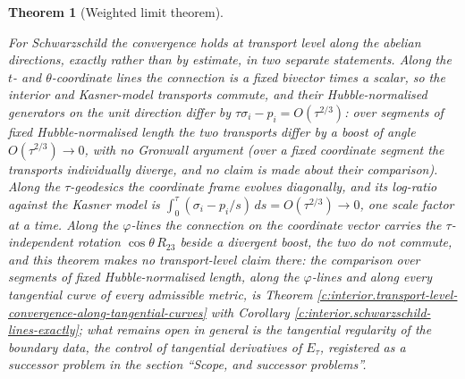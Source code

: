 \documentclass[11pt]{article}
\newtheorem{theorem}{Theorem}[section]
\theoremstyle{definition}
\theoremstyle{plain}
\begin{document}
\begin{theorem}[Weighted limit theorem]
\begin{enumerate}
\end{enumerate}
For Schwarzschild the convergence holds at transport level along the abelian directions, exactly rather than by estimate, in two separate statements. Along the $t$- and $\theta$-coordinate lines the connection is a fixed bivector times a scalar, so the interior and Kasner-model transports commute, and their Hubble-normalised generators on the unit direction differ by $\tau\sigma_i - p_i = O(\tau^{2/3})$: over segments of fixed Hubble-normalised length the two transports differ by a boost of angle $O(\tau^{2/3}) \to 0$, with no Gronwall argument (over a fixed \emph{coordinate} segment the transports individually diverge, and no claim is made about their comparison). Along the $\tau$-geodesics the coordinate frame evolves diagonally, and its log-ratio against the Kasner model is $\int_0^\tau (\sigma_i - p_i/s)\,ds = O(\tau^{2/3}) \to 0$, one scale factor at a time. Along the $\varphi$-lines the connection on the coordinate vector carries the $\tau$-independent rotation $\cos\theta\,R_{23}$ beside a divergent boost, the two do not commute, and this theorem makes no transport-level claim there: the comparison over segments of fixed Hubble-normalised length, along the $\varphi$-lines and along every tangential curve of every admissible metric, is Theorem \ref{c:interior.transport-level-convergence-along-tangential-curves} with Corollary \ref{c:interior.schwarzschild-lines-exactly}; what remains open in general is the tangential regularity of the boundary data, the control of tangential derivatives of $E_\tau$, registered as a successor problem in the section ``Scope, and successor problems''.
\end{theorem}
\end{document}
